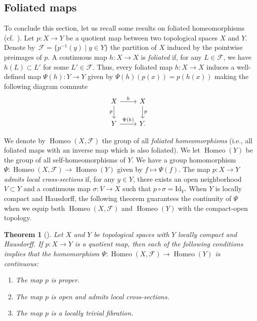 \documentclass[10pt,a4paper]{amsart}
\numberwithin{equation}{section}
\newtheorem{thm}{Theorem}[section]
\theoremstyle{definition}
\DeclareMathOperator{\Home}{\mathrm{Homeo}}
\newcommand{\Id}{\mathrm{Id}}
\newcommand{\fol}{\mathcal{F}}
\begin{document}
	
\subsection{Foliated maps}
\label{s:foliated.maps}
To conclude this section, let us recall some results on foliated homeomorphisms (cf.\ \cite[Section~3]{MaysmenkoPolulyakh}). Let $p\colon X\to Y$ be a quotient map between two topological spaces $X$ and $Y$. Denote by~${\fol = \big\{p^{-1}(y)\mid y\in Y\big\}}$ the partition of $X$ induced by the pointwise preimages of $p$.
A continuous map $h\colon X\to X$ is \emph{foliated} if, for any $L\in \fol$, we have $h(L)\subset L'$ for some $L'\in \fol$.
Thus, every foliated map $h\colon X\to X$ induces a well-defined map $\Psi(h)\colon Y\to Y$
 given by $\Psi(h)(p(x)) = p(h(x))$
making the following diagram commute
\[
	\begin{tikzcd}
	X \arrow[d, "p", labels = left] \arrow[r,"h"]& X \arrow[d,"p"]\\
	Y \arrow[r,"\Psi(h)"] & Y.
	\end{tikzcd}
\]

We denote by $\Home(X,\fol)$ the group of all \emph{foliated homeomorphisms} (i.e., all foliated maps with an inverse map which is also foliated). We let $\Home(Y)$ be the group of all self-homeomorphisms of $Y$. We have a group homomorphism $\Psi\colon \Home(X,\fol)\to \Home(Y)$ given by $f\mapsto \Psi(f)$. The map $p\colon X\to Y$ \emph{admits local cross-sections} if, for any $y\in Y$, there exists an open neighborhood $V\subset Y$ and a continuous map $\sigma\colon V\to X$ such that $p\circ \sigma = \Id_{V}$.
When $Y$ is locally compact and Hausdorff, the following theorem guarantees the continuity of $\Psi$ when we equip both $\Home(X,\fol)$ and $\Home(Y)$ with the compact-open topology.
	
\begin{thm}[]\label{T: Continuity of psi}
Let $X$ and $Y$ be topological spaces with $Y$ locally compact and Hausdorff. If $p\colon X \to Y$ is a quotient map, then each of the following conditions implies that the homomorphism $\Psi\colon \Home(X,\fol)\to \Home(Y)$ is continuous:
		\begin{enumerate}\itemsep=0pt
		 \item[$(1)$] The map $p$ is proper.
		 \item[$(2)$] The map $p$ is open and admits local cross-sections.
		 \item[$(3)$] The map $p$ is a locally trivial fibration.
		\end{enumerate}
	\end{thm}
	
\end{document}
